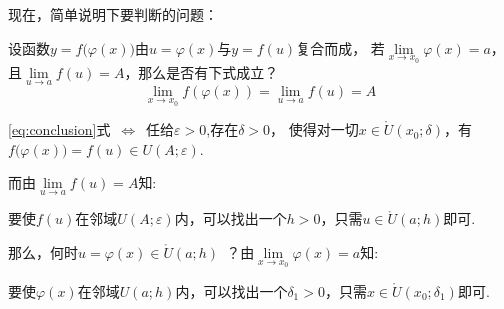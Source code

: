 \newpage
现在，简单说明下要判断的问题：\par
\begin{framed}
    设函数$y=f\bigl(\varphi(x)\bigr)$由$u=\varphi(x)$与$y=f(u)$复合而成，
    若$\lim\limits_{x \to x_0}\varphi(x)=a$，且$\lim\limits_{u \to a}f(u)=A$，那么是否有下式成立？
    \begin{equation}
        \lim_{x \to x_0} f(\varphi(x))=\lim_{u \to a} f(u)=A\label{eq:conclusion}
    \end{equation}
\end{framed}
\begin{framed}
    \eqref{eq:conclusion}式~$\iff$~任给$\varepsilon>0$,存在$\delta>0$，
    使得对一切$x\in\mathring{U}(x_0;\delta)$，有$f\bigl(\varphi(x)\bigr)=f(u)\in{U}(A;\varepsilon)$.
\end{framed}
而由$\lim\limits_{u \to a}f(u)=A$知:
\begin{framed}
    要使$f(u)$在邻域${U}(A;\varepsilon)$内，可以找出一个$h>0$，只需$u\in\mathring{U}(a;h)$即可.
\end{framed}
那么，何时$u=\varphi(x)\in\mathring{U}(a;h)$~？由$\lim\limits_{x \to x_0}\varphi(x)=a$知:
\begin{framed}
    要使$\varphi(x)$在邻域${U}(a;h)$内，可以找出一个$\delta_1>0$，只需$x\in\mathring{U}(x_0;\delta_1)$即可.
\end{framed}

